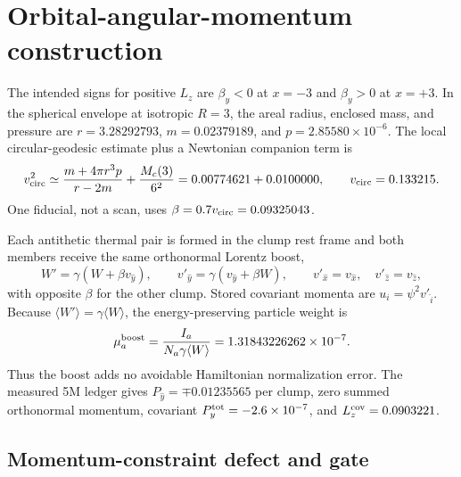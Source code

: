 \documentclass[11pt]{article}
\begin{document}
\section{Orbital-angular-momentum construction}

The intended signs for positive $L_z$ are $\beta_y<0$ at $x=-3$ and $\beta_y>0$ at
$x=+3$.  In the spherical envelope at isotropic $R=3$, the areal radius, enclosed mass,
and pressure are $r=3.28292793$, $m=0.02379189$, and $p=2.85580\times10^{-6}$.
The local circular-geodesic estimate plus a Newtonian companion term is
\begin{equation}
 v_{\rm circ}^2\simeq
 \frac{m+4\pi r^3p}{r-2m}+\frac{M_c(3)}{6^2}
 =0.00774621+0.0100000,\qquad v_{\rm circ}=0.133215.
\end{equation}
One fiducial, not a scan, uses $\beta=0.7v_{\rm circ}=0.09325043$.

Each antithetic thermal pair is formed in the clump rest frame and both members receive
the same orthonormal Lorentz boost,
\begin{equation}
 W'=\gamma(W+\beta v_{\hat y}),\qquad
 v'_{\hat y}=\gamma(v_{\hat y}+\beta W),\qquad
 v'_{\hat x}=v_{\hat x},\quad v'_{\hat z}=v_{\hat z},
\end{equation}
with opposite $\beta$ for the other clump.  Stored covariant momenta are
$u_i=\psi^2v'_{\hat i}$.  Because $\langle W'\rangle=\gamma\langle W\rangle$, the
energy-preserving particle weight is
\begin{equation}
 \mu_a^{\rm boost}=\frac{I_a}{N_a\gamma\langle W\rangle}
 =1.31843226262\times10^{-7}.
\end{equation}
Thus the boost adds no avoidable Hamiltonian normalization error.  The measured 5M
ledger gives $P_{\hat y}=\mp0.01235565$ per clump, zero summed orthonormal momentum,
covariant $P_y^{\rm tot}=-2.6\times10^{-7}$, and $L_z^{\rm cov}=0.0903221$.

\subsection{Momentum-constraint defect and gate}
\end{document}
